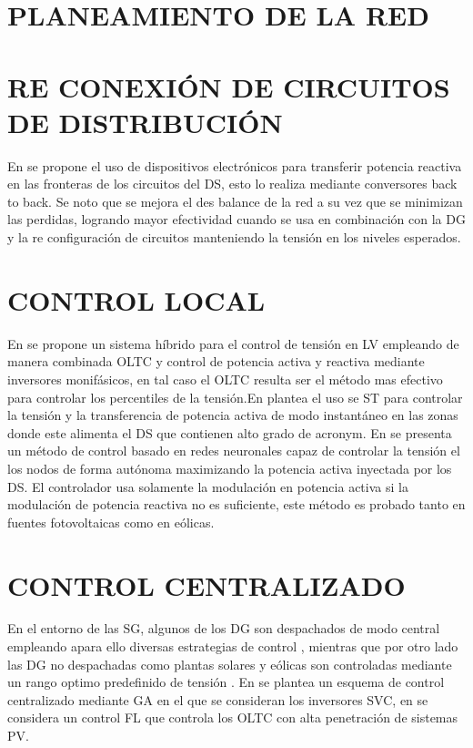 \documentclass[12pt, letterpaper]{report}
\begin{document}
\section{PLANEAMIENTO DE LA RED}

\section{RE CONEXIÓN DE CIRCUITOS DE DISTRIBUCIÓN}
\label{cap:clasificacion}
En \cite{Cao2016} se propone el uso de dispositivos electrónicos para transferir potencia reactiva en las fronteras de los circuitos del \ac{DS}, esto lo realiza mediante conversores back to back. Se noto que se mejora el des balance de la red a su vez que se minimizan las perdidas, logrando mayor efectividad cuando se usa en combinación con la DG y la re configuración de circuitos manteniendo la tensión en los niveles esperados.\\

\section{CONTROL LOCAL}
En \cite{Efkarpidis2016} se propone un sistema híbrido para el control de tensión en LV empleando de manera combinada OLTC y control de potencia activa y reactiva mediante inversores monifásicos, en tal caso el OLTC resulta ser el método mas efectivo para controlar los percentiles de la tensión.En \cite{Colak2015} plantea el uso se \ac{ST} para controlar la tensión y la transferencia de potencia activa de modo instantáneo en las zonas donde este alimenta el \ac{DS}  que contienen alto grado de \ac{acronym}. En \cite{Calderaro2014} se presenta un método de control basado en redes neuronales  capaz de controlar la tensión el los nodos de forma autónoma maximizando la potencia activa inyectada por los \ac{DS}. El controlador usa solamente la modulación en potencia activa si la modulación  de potencia reactiva no es suficiente, este método es probado tanto en fuentes fotovoltaicas  como en eólicas.\\  
\section{CONTROL CENTRALIZADO}
En el entorno de las \ac{SG}, algunos de los  \ac{DG} son despachados de modo central empleando apara ello diversas estrategias de control , mientras que por otro lado las \ac{DG} no despachadas como plantas solares y eólicas son controladas mediante un rango optimo predefinido de tensión \cite{Vandoorn2013} \cite{colak2015survey}.
En \cite{Oshiro2011a} se plantea un esquema de control centralizado mediante \ac{GA}  en el que se consideran los inversores SVC,  en \cite{Shalwala2011a} se considera un control \ac{FL} que controla los \ac{OLTC}  con alta penetración de sistemas \ac{PV}.
\end{document}
